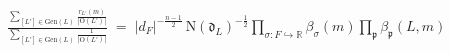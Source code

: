 \documentclass[border=8pt,varwidth=40cm]{standalone}
\begin{document}
\(\displaystyle
\frac{\displaystyle\sum_{[L'] \in \mathrm{Gen}(L)} \frac{r_{L'}(m)}{|\mathrm{O}(L')|}}{\displaystyle\sum_{[L'] \in \mathrm{Gen}(L)} \frac{1}{|\mathrm{O}(L')|}}
\;=\;
|d_F|^{-\frac{n-1}{2}}\, \mathrm{N}(\mathfrak{d}_L)^{-\frac{1}{2}}
\prod_{\sigma\colon F\hookrightarrow\mathbb{R}} \beta_{\sigma}(m)
\prod_{\mathfrak{p}} \beta_{\mathfrak{p}}(L, m)
\)
\end{document}
